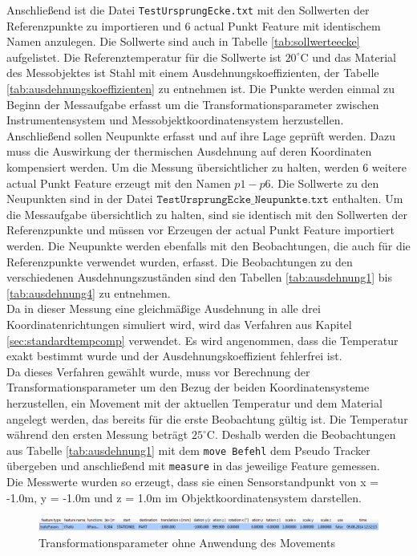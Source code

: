 Anschließend ist die Datei \texttt{TestUrsprungEcke.txt} mit den Sollwerten der Referenzpunkte zu importieren und 6 actual Punkt Feature mit identischem Namen anzulegen. Die Sollwerte sind auch in Tabelle \ref{tab:sollwerteecke} aufgelistet. Die Referenztemperatur für die Sollwerte ist $20^\circ\text{C}$ und das Material des Messobjektes ist Stahl mit einem Ausdehnungskoeffizienten, der Tabelle \ref{tab:ausdehnungskoeffizienten} zu entnehmen ist. Die Punkte werden einmal zu Beginn der Messaufgabe erfasst um die Transformationsparameter zwischen Instrumentensystem und Messobjektkoordinatensystem herzustellen. Anschließend sollen Neupunkte erfasst und auf ihre Lage geprüft werden. Dazu muss die Auswirkung der thermischen Ausdehnung auf deren Koordinaten kompensiert werden. Um die Messung übersichtlicher zu halten, werden 6 weitere actual Punkt Feature erzeugt mit den Namen $p1 - p6$. Die Sollwerte zu den Neupunkten sind in der Datei $\texttt{TestUrsprungEcke\_Neupunkte.txt}$ enthalten. Um die Messaufgabe übersichtlich zu halten, sind sie identisch mit den Sollwerten der Referenzpunkte und müssen vor Erzeugen der actual Punkt Feature importiert werden. Die Neupunkte werden ebenfalls mit den Beobachtungen, die auch für die Referenzpunkte verwendet wurden, erfasst. Die Beobachtungen zu den verschiedenen Ausdehnungszuständen sind den Tabellen \ref{tab:ausdehnung1} bis \ref{tab:ausdehnung4} zu entnehmen.\\
Da in dieser Messung eine gleichmäßige Ausdehnung in alle drei Koordinatenrichtungen simuliert wird, wird das Verfahren aus Kapitel \ref{sec:standardtempcomp} verwendet. Es wird angenommen, dass die Temperatur exakt bestimmt wurde und der Ausdehnungskoeffizient fehlerfrei ist.\\
Da dieses Verfahren gewählt wurde, muss vor Berechnung der Transformationsparameter um den Bezug der beiden Koordinatensysteme herzustellen, ein Movement mit der aktuellen Temperatur und dem Material angelegt werden, das bereits für die erste Beobachtung gültig ist. Die Temperatur während den ersten Messung beträgt $25^\circ\text{C}$. Deshalb werden die Beobachtungen aus Tabelle \ref{tab:ausdehnung1} mit dem \texttt{move Befehl} dem Pseudo Tracker übergeben und anschließend mit \texttt{measure} in das jeweilige Feature gemessen.\\
Die Messwerte wurden so erzeugt, dass sie einen Sensorstandpunkt von x = -1.0m, y = -1.0m und z = 1.0m im Objektkoordinatensystem darstellen.

\begin{figure}[h]
\label{fig:trafoParamausdehnung1ohnecomp}
\centering
	\includegraphics[scale=1.7]{bilder/Testmessung/ursprungecke/trafoParamausdehnung1ohnecomp}
	\caption{Transformationsparameter ohne Anwendung des Movements}
\end{figure}


